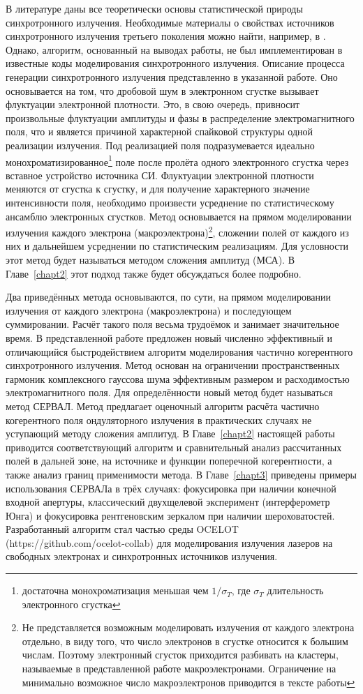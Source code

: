В литературе даны все теоретически основы статистической природы синхротронного излучения. Необходимые материалы о свойствах источников синхротронного излучения третьего поколения можно найти, например, в \cite{geloni_transverse_2008}. Однако, алгоритм, основанный на выводах работы, не был имплементирован в известные коды  моделирования синхротронного излучения. Описание процесса генерации синхротронного излучения представленно в указанной работе. Оно основывается на том, что дробовой шум в электронном сгустке вызывает флуктуации электронной плотности. Это, в свою очередь, привносит произвольные флуктуации амплитуды и фазы в распределение электромагнитного поля, что и является причиной характерной спайковой структуры одной реализации излучения. Под реализацией поля подразумевается идеально монохроматизированное\footnote{достаточна монохроматизация меньшая чем $1/\sigma_{T}$, где $\sigma_{T}$ длительность электронного сгустка} поле после пролёта одного электронного сгустка через вставное устройство источника СИ. Флуктуации электронной плотности меняются от сгустка к сгустку, и для получение характерного значение интенсивности поля, необходимо произвести усреднение по статистическому ансамблю электронных сгустков. Метод основывается на прямом моделировании излучения каждого электрона (макроэлектрона)\footnote{Не представляется возможным моделировать излучения от каждого электрона отдельно, в виду того, что число электронов в сгустке относится к большим числам. Поэтому электронный сгусток приходится разбивать на кластеры, называемые в представленной работе макроэлектронами. Ограничение на минимально возможное число макроэлектронов приводится в тексте работы}, сложении полей от каждого из них и дальнейшем усреднении по статистическим реализациям. Для условности этот метод будет называться методом сложения амплитуд (МСА). В Главе~\ref{chapt2} этот подход также будет обсуждаться более подробно.

Два приведённых метода основываются, по сути, на прямом моделировании излучения от каждого электрона (макроэлектрона) и последующем суммировании. Расчёт такого поля весьма трудоёмок и занимает значительное время. В представленной работе предложен новый численно эффективный и отличающийся быстродействием алгоритм моделирования частично когерентного синхротронного излучения. Метод основан на ограничении пространственных гармоник комплексного гауссова шума эффективным размером и расходимостью электромагнитного поля. Для определённости новый метод будет называться метод СЕРВАЛ. Метод предлагает оценочный алгоритм расчёта частично когерентного поля ондуляторного излучения в практических случаях не уступающий методу сложения амплитуд. В Главе~\ref{chapt2} настоящей работы приводится соответствующий алгоритм и сравнительный анализ рассчитанных полей в дальней зоне, на источнике и функции поперечной когерентности, а также анализ границ применимости метода. В Главе~\ref{chapt3} приведены примеры использования СЕРВАЛа в трёх случаях: фокусировка при наличии конечной входной апертуры, классический двухщелевой эксперимент (интерферометр Юнга) и фокусировка рентгеновским зеркалом при наличии шероховатостей. Разработанный алгоритм стал частью среды OCELOT (https://github.com/ocelot-collab) для моделирования излучения лазеров на свободных электронах и синхротронных источников излучения. 

